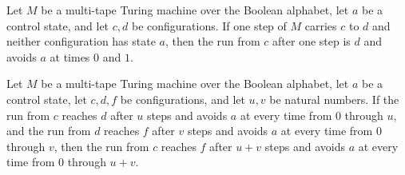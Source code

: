 \begin{lemma}
\label{Turing.FinTM.splitSafe_one}
\leanok
{}
Let $M$ be a multi-tape Turing machine over the Boolean alphabet, let $a$ be a control
state, and let $c,d$ be configurations. If one step of $M$ carries $c$ to $d$ and
neither configuration has state $a$, then the run from $c$ after one step is $d$ and
avoids $a$ at times $0$ and $1$.
\end{lemma}

\begin{lemma}
\label{Turing.FinTM.splitSafe_join}
\leanok
{}
Let $M$ be a multi-tape Turing machine over the Boolean alphabet, let $a$ be a control
state, let $c,d,f$ be configurations, and let $u,v$ be natural numbers. If the run from
$c$ reaches $d$ after $u$ steps and avoids $a$ at every time from $0$ through $u$, and
the run from $d$ reaches $f$ after $v$ steps and avoids $a$ at every time from $0$
through $v$, then the run from $c$ reaches $f$ after $u+v$ steps and avoids $a$ at every
time from $0$ through $u+v$.
\end{lemma}

